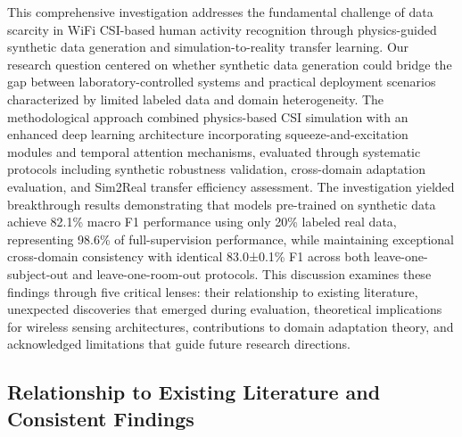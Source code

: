 \documentclass[journal]{IEEEtran}
\begin{document}
This comprehensive investigation addresses the fundamental challenge of data scarcity in WiFi CSI-based human activity recognition through physics-guided synthetic data generation and simulation-to-reality transfer learning. Our research question centered on whether synthetic data generation could bridge the gap between laboratory-controlled systems and practical deployment scenarios characterized by limited labeled data and domain heterogeneity. The methodological approach combined physics-based CSI simulation with an enhanced deep learning architecture incorporating squeeze-and-excitation modules and temporal attention mechanisms, evaluated through systematic protocols including synthetic robustness validation, cross-domain adaptation evaluation, and Sim2Real transfer efficiency assessment. The investigation yielded breakthrough results demonstrating that models pre-trained on synthetic data achieve 82.1\% macro F1 performance using only 20\% labeled real data, representing 98.6\% of full-supervision performance, while maintaining exceptional cross-domain consistency with identical 83.0±0.1\% F1 across both leave-one-subject-out and leave-one-room-out protocols. This discussion examines these findings through five critical lenses: their relationship to existing literature, unexpected discoveries that emerged during evaluation, theoretical implications for wireless sensing architectures, contributions to domain adaptation theory, and acknowledged limitations that guide future research directions.

\subsection{Relationship to Existing Literature and Consistent Findings}
\end{document}
